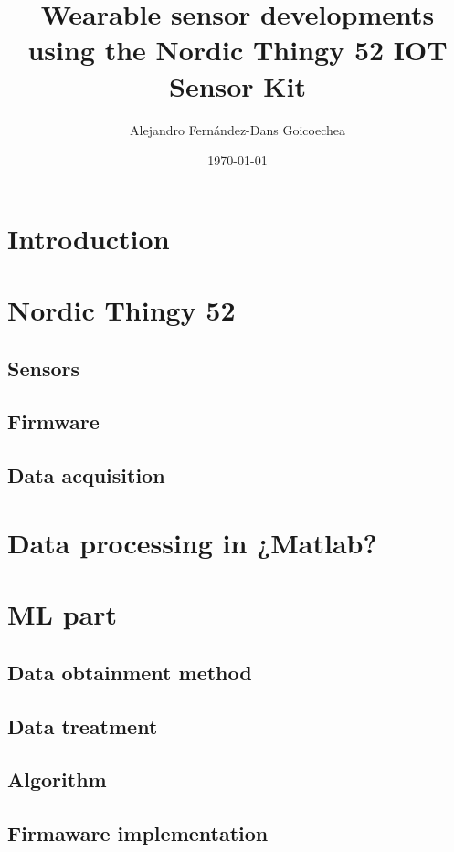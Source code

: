 \documentclass[a4paper, 11pt] {article}
\title{Wearable sensor developments using the Nordic Thingy 52 IOT Sensor Kit}
\author{Alejandro Fernández-Dans Goicoechea}
\date{\today}
\begin{document}
	\maketitle
	\section{Introduction}
	\section{Nordic Thingy 52}
	\subsection{Sensors}
	\subsection{Firmware}
	\subsection{Data acquisition}
	\section{Data processing in ¿Matlab?}
	\section{ML part}
	\subsection{Data obtainment method}
	\subsection{Data treatment}
	\subsection{Algorithm}
	\subsection{Firmaware implementation}
\end{document}
